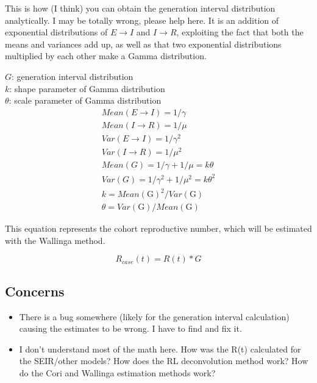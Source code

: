 \documentclass{article}
\begin{document}
This is how (I think) you can obtain the generation interval distribution analytically. I may be totally wrong, please help here. It is an addition of exponential distributions of $E \xrightarrow{}I$ and $I \xrightarrow{} R$, exploiting the fact that both the means and variances add up, as well as that two exponential distributions multiplied by each other make a Gamma distribution.


$G$: generation interval distribution \\ 
$k$: shape parameter of Gamma distribution\\
$\theta$: scale parameter of Gamma distribution\\

\begin{align}
    Mean(E \xrightarrow{}I) = 1/\gamma \\ 
    Mean(I \xrightarrow{}R) = 1/\mu \\ 
    Var(E \xrightarrow{}I) = 1/\gamma^2 \\ 
    Var(I \xrightarrow{}R) = 1/\mu^2 \\
    Mean(G) = 1/\gamma + 1/\mu = k\theta\\ 
    Var(G) = 1/\gamma^2 + 1/\mu^2 = k\theta^2 \\ 
    k =  Mean(\text{G})^2/Var(\text{G}) \\
    \theta = Var(\text{G})/Mean(\text{G})
\end{align}

This equation represents the cohort reproductive number, which will be estimated with the Wallinga method.

\begin{equation}
    R_{case}(t) = R(t) * G
\end{equation}

\subsection{Concerns}
\begin{itemize}
    \item There is a bug somewhere (likely for the generation interval calculation) causing the estimates to be wrong. I have to find and fix it.
    \item I don't understand most of the math here. How was the R(t) calculated for the SEIR/other models? How does the RL deconvolution method work? How do the Cori and Wallinga estimation methods work?
\end{itemize}
\end{document}
